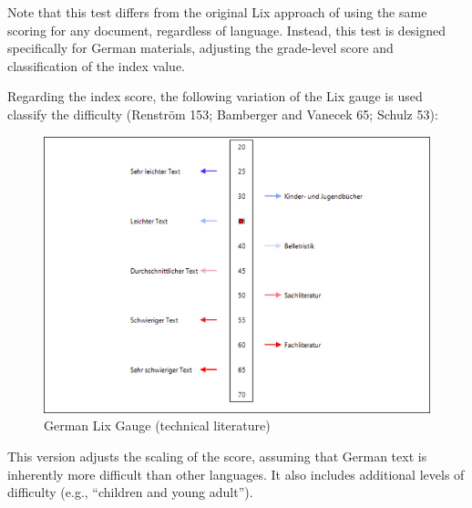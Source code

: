 \documentclass[
]{book}
\theoremstyle{definition}
\theoremstyle{definition}
\theoremstyle{definition}
\theoremstyle{definition}
\theoremstyle{remark}
\begin{document}
Note that this test differs from the original Lix approach of using the same scoring for any document, regardless of language. Instead, this test is designed specifically for German materials, adjusting the grade-level score and classification of the index value.

Regarding the index score, the following variation of the Lix gauge is used classify the difficulty (Renström 153; Bamberger and Vanecek 65; Schulz 53):

\begin{figure}[H]

{\centering \includegraphics[width=0.75\linewidth,]{Images/GermanLixGauge} 

}

\caption{German Lix Gauge (technical literature)}\label{fig:germanLix2}
\end{figure}

This version adjusts the scaling of the score, assuming that German text is inherently more difficult than other languages. It also includes additional levels of difficulty (e.g., ``children and young adult'').
\end{document}
